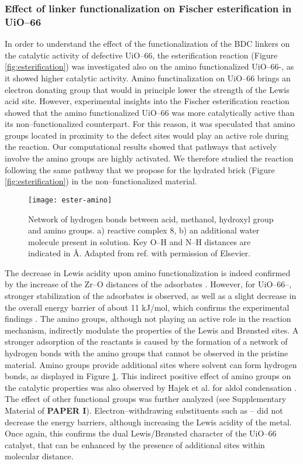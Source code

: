 \subsubsection*{Effect of linker functionalization on Fischer esterification in UiO--66}
In order to understand the effect of the functionalization of the BDC linkers on the catalytic activity of defective UiO--66, the esterification reaction (Figure \ref{fig:esterification}) was investigated also on the amino functionalized UiO--66-, as it showed higher catalytic activity. Amino functinalization on UiO--66 brings an electron donating group that would in principle lower the strength of the Lewis acid site. However, experimental insights into the Fischer esterification reaction showed that the amino functionalized UiO--66 was more catalytically active than its non--functionalized counterpart. For this reason, it was speculated that amino groups located in proximity to the defect sites would play an active role during the reaction. Our computational results showed that pathways that actively involve the amino groups are highly activated. We therefore studied the reaction following the same pathway that we propose for the hydrated brick (Figure \ref{fig:esterification}) in the non--functionalized material.
\npar
\begin{figure}[!htbp]
	\centering
	\texttt{[image: ester-amino]}
	\caption{Network of hydrogen bonds between acid, methanol, hydroxyl group and amino groups. a) reactive complex 8, b) an additional water molecule present in solution. Key O--H and N--H distances are indicated in \AA. Adapted from ref. \cite{caratelli2017nature} with permission of Elsevier.}
	\label{fig:ester-amino}
\end{figure}
The decrease in Lewis acidity upon amino functionalization is indeed confirmed by the increase of the Zr--O distances of the adsorbates \cite{vermoortele2012electronic}. However, for UiO--66--, stronger stabilization of the adsorbates is observed, as well as a slight decrease in the overall energy barrier of about 11 kJ/mol, which confirms the experimental findings \cite{cirujano2015conversion, cirujano2015zirconium}. The amino groups, although not playing an active role in the reaction mechanism, indirectly modulate the properties of the Lewis and Br\o{}nsted sites. A stronger adsorption of the reactants is caused by the formation of a network of hydrogen bonds with the amino groups that cannot be observed in the pristine material. Amino groups provide additional sites where solvent can form hydrogen bonds, as displayed in Figure \ref{fig:ester-amino}. This indirect positive effect of amino groups on the catalytic properties was also observed by Hajek et al. for aldol condensation \cite{vandichel2015active}. The effect of other functional groups was further analyzed (see Supplementary Material of \textbf{PAPER I}). Electron--withdrawing substituents such as -- did not decrease the energy barriers, although increasing the Lewis acidity of the metal. Once again, this confirms the dual Lewis/Br\o{}nsted character of the UiO--66 catalyst, that can be enhanced by the presence of additional sites within molecular distance. 


